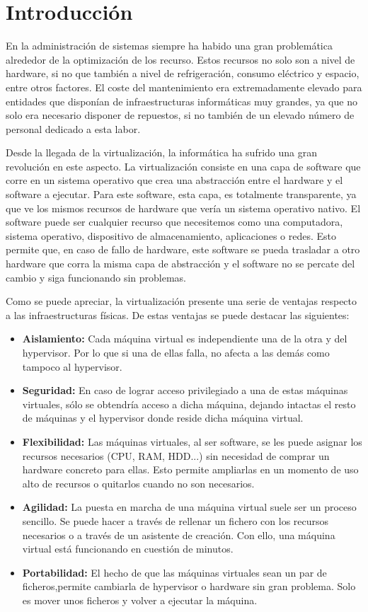 \documentclass[12pt,a4paper,titlepage,twoside]{report}
\begin{document}
\chapter{Introducción}
En la administración de sistemas siempre ha habido una gran problemática alrededor de la optimización de los recurso. Estos recursos no solo son a nivel de hardware, si no que también a nivel de refrigeración, consumo eléctrico y espacio, entre otros factores. El coste del mantenimiento era extremadamente elevado para entidades que disponían de infraestructuras informáticas muy grandes, ya que no solo era necesario disponer de repuestos, si no también de un elevado número de personal dedicado a esta labor.
\par
Desde la llegada de la virtualización, la informática ha sufrido una gran revolución en este aspecto. La virtualización consiste en una capa de software que corre en un sistema operativo que crea una abstracción entre el hardware y el software a ejecutar. Para este software, esta capa, es totalmente transparente, ya que ve los mismos recursos de hardware que vería un sistema operativo nativo. El software puede ser cualquier recurso que necesitemos como una computadora, sistema operativo, dispositivo de almacenamiento, aplicaciones o redes. Esto permite que, en caso de fallo de hardware, este software se pueda trasladar a otro hardware que corra la misma capa de abstracción y el software no se percate del cambio y siga funcionando sin problemas. 
\par
Como se puede apreciar, la virtualización presente una serie de ventajas respecto a las infraestructuras físicas. De estas ventajas se puede destacar las siguientes:
\begin{itemize}
\item \textbf{Aislamiento:} Cada máquina virtual es independiente una de la otra y del hypervisor. Por lo que si una de ellas falla, no afecta a las demás como tampoco al hypervisor.
\item \textbf{Seguridad:} En caso de lograr acceso privilegiado a una de estas máquinas virtuales, sólo se obtendría acceso a dicha máquina, dejando intactas el resto de máquinas y  el hypervisor donde reside dicha máquina virtual.
\item \textbf{Flexibilidad:} Las máquinas virtuales, al ser software, se les puede asignar los recursos necesarios (CPU, RAM, HDD...) sin necesidad de comprar un hardware concreto para ellas. Esto permite ampliarlas en un momento de uso alto de recursos o quitarlos cuando no son necesarios.
\item \textbf{Agilidad:} La puesta en marcha de una máquina virtual suele ser un proceso sencillo. Se puede hacer a través de rellenar un fichero con los recursos necesarios o a través de un asistente de creación. Con ello, una máquina virtual está funcionando en cuestión de minutos.
\item \textbf{Portabilidad:} El hecho de que las máquinas virtuales sean un par de ficheros,permite cambiarla de hypervisor o hardware sin gran problema. Solo es mover unos ficheros y volver a ejecutar la máquina.
\end{itemize}
\end{document}
